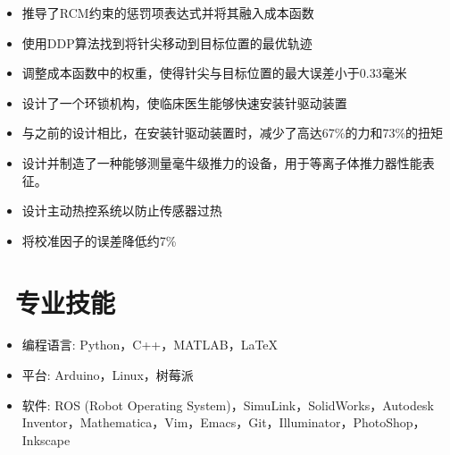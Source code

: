 \documentclass{resume}
\begin{document}
\vspace{-0.7em}
\begin{onehalfspacing}
  \begin{itemize}
    \item 推导了RCM约束的惩罚项表达式并将其融入成本函数
    \item 使用DDP算法找到将针尖移动到目标位置的最优轨迹
    \item 调整成本函数中的权重，使得针尖与目标位置的最大误差小于0.33毫米
  \end{itemize}
\end{onehalfspacing}

\vspace{-0.7em}
\begin{onehalfspacing}
  \begin{itemize}
    \item 设计了一个环锁机构，使临床医生能够快速安装针驱动装置
    \item 与之前的设计相比，在安装针驱动装置时，减少了高达67\%的力和73\%的扭矩
  \end{itemize}
\end{onehalfspacing}

\vspace{-0.7em}
\begin{onehalfspacing}
  \begin{itemize}
    \item 设计并制造了一种能够测量毫牛级推力的设备，用于等离子体推力器性能表征。
    \item 设计主动热控系统以防止传感器过热
    \item 将校准因子的误差降低约7\%
  \end{itemize}
\end{onehalfspacing}



\section{\faCogs\ 专业技能}
\begin{itemize}[parsep=0.5ex]
  \item 编程语言: Python，C++，MATLAB，\LaTeX
  \item 平台: Arduino，Linux，树莓派
  \item 软件: ROS (Robot Operating System)，SimuLink，SolidWorks，Autodesk Inventor，Mathematica，Vim，Emacs，Git，Illuminator，PhotoShop，Inkscape
\end{itemize}
\end{document}

